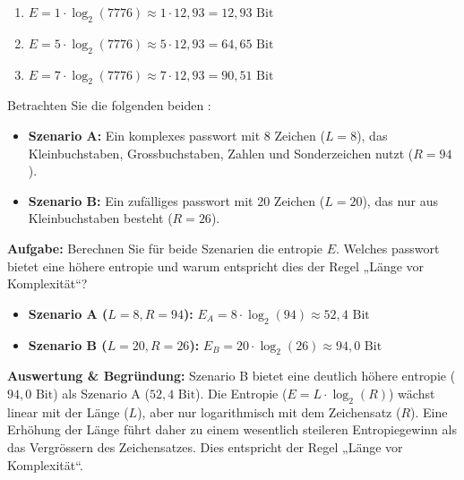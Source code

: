 \documentclass[12pt,a4paper]{article}
\begin{document}
\begin{solutionbox}
\begin{enumerate}[label=\alph*)]
    \item $E = 1 \cdot \log_2(7776) \approx 1 \cdot 12{,}93 = 12{,}93 \text{ Bit}$
    \item $E = 5 \cdot \log_2(7776) \approx 5 \cdot 12{,}93 = 64{,}65 \text{ Bit}$
    \item $E = 7 \cdot \log_2(7776) \approx 7 \cdot 12{,}93 = 90{,}51 \text{ Bit}$
\end{enumerate}
\end{solutionbox}

\begin{taskbox}
Betrachten Sie die folgenden beiden :
\begin{itemize}
    \item \textbf{Szenario A:} Ein komplexes \gls{passwort} mit 8 Zeichen ($L = 8$), \newline das \mbox{Kleinbuchstaben}, \mbox{Grossbuchstaben}, \mbox{Zahlen} und \mbox{Sonderzeichen} nutzt \newline($R = 94$).
    \item \textbf{Szenario B:} Ein zufälliges \gls{passwort} mit 20 Zeichen ($L = 20$), das nur aus Kleinbuchstaben besteht ($R = 26$).
\end{itemize}
\textbf{Aufgabe:} Berechnen Sie für beide Szenarien die \gls{entropie} $E$. Welches \gls{passwort} bietet eine höhere \gls{entropie} und warum entspricht dies der Regel „Länge vor \mbox{Komplexität}“?
\end{taskbox}

\begin{solutionbox}
\begin{itemize}
    \item \textbf{Szenario A ($L=8, R=94$):} $E_A = 8 \cdot \log_2(94) \approx 52{,}4 \text{ Bit}$
    \item \textbf{Szenario B ($L=20, R=26$):} $E_B = 20 \cdot \log_2(26) \approx 94{,}0 \text{ Bit}$
\end{itemize}
\textbf{Auswertung \& Begründung:} Szenario B bietet eine deutlich höhere \gls{entropie} ($94{,}0 \text{ Bit}$) als Szenario A ($52{,}4 \text{ Bit}$). Die Entropie ($E = L \cdot \log_2(R)$) wächst linear mit der Länge ($L$), aber nur logarithmisch mit dem Zeichensatz ($R$). Eine Erhöhung der Länge führt daher zu einem wesentlich steileren Entropiegewinn als das Vergrössern des Zeichensatzes. Dies entspricht der Regel „Länge vor \mbox{Komplexität}“.
\end{solutionbox}
\end{document}
